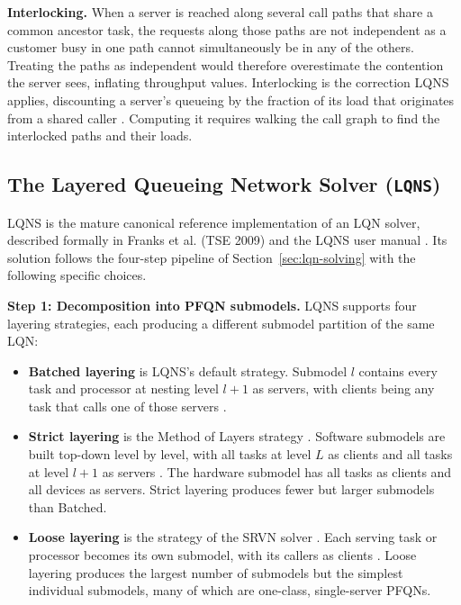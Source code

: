 \textbf{Interlocking.} When a server is reached along several call paths that share a common ancestor task, the requests along those paths are not independent as a customer busy in one path cannot simultaneously be in any of the others. Treating the paths as independent would therefore overestimate the contention the server sees, inflating throughput values. Interlocking is the correction LQNS applies, discounting a server's queueing by the fraction of its load that originates from a shared caller \cite{franks99,franks2009}. Computing it requires walking the call graph to find the interlocked paths and their loads.

\subsection{The Layered Queueing Network Solver (\texttt{LQNS})}
\label{sec:lqn-lqns-v5}

LQNS is the mature canonical reference implementation of an LQN solver, described formally in Franks et al. (TSE 2009) \cite{franks2009} and the LQNS user manual \cite{franks2022manual}. Its solution follows the four-step pipeline of Section~\ref{sec:lqn-solving} with the following specific choices.

\textbf{Step 1: Decomposition into PFQN submodels.} LQNS supports four layering strategies, each producing a different submodel partition of the same LQN:

\begin{itemize}
\item \textbf{Batched layering} is LQNS's default strategy. Submodel $l$ contains every task and processor at nesting level $l + 1$ as servers, with clients being any task that calls one of those servers \cite{franks99}.
\end{itemize}

\begin{itemize}
\item \textbf{Strict layering} is the Method of Layers strategy \cite{rolia95}. Software submodels are built top-down level by level, with all tasks at level $L$ as clients and all tasks at level $l + 1$ as servers \cite{franks99}. The hardware submodel has all tasks as clients and all devices as servers. Strict layering produces fewer but larger submodels than Batched.
\end{itemize}

\begin{itemize}
\item \textbf{Loose layering} is the strategy of the SRVN solver \cite{woodside89}. Each serving task or processor becomes its own submodel, with its callers as clients \cite{franks99}. Loose layering produces the largest number of submodels but the simplest individual submodels, many of which are one-class, single-server PFQNs.
\end{itemize}

